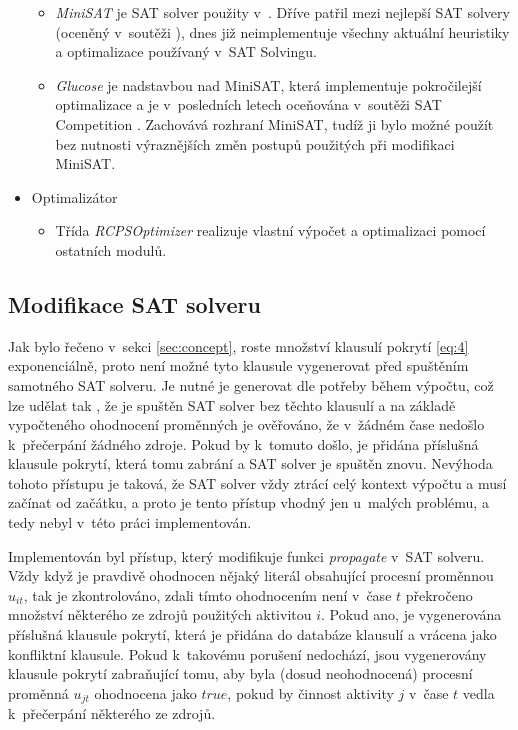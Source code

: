 \documentclass[a4paper, 12pt]{article}
\begin{document}
\begin{itemize}
    \begin{itemize}
        \item \emph{MiniSAT} \cite{www:minisat} je SAT solver použity v~\cite{horbach:10}.
        Dříve patřil mezi nejlepší SAT solvery (oceněný v~soutěži \cite{www:sat}), dnes již neimplementuje
        všechny aktuální heuristiky a optimalizace používaný v~SAT Solvingu.
        \item \emph{Glucose} \cite{www:glucose} je nadstavbou nad MiniSAT, která implementuje
        pokročilejší optimalizace a je v~posledních letech oceňována v~soutěži SAT Competition \cite{www:sat}.
        Zachovává rozhraní MiniSAT, tudíž ji bylo možné použít bez nutnosti výraznějších změn postupů použitých při
        modifikaci MiniSAT.
    \end{itemize}
 \item Optimalizátor
    \begin{itemize}
        \item Třída \emph{RCPSOptimizer} realizuje vlastní výpočet a optimalizaci pomocí ostatních modulů.
    \end{itemize}
\end{itemize}

\subsection{Modifikace SAT solveru}
Jak bylo řečeno v~sekci \ref{sec:concept}, roste množství klausulí pokrytí \ref{eq:4} exponenciálně,
proto není možné tyto klausule vygenerovat před spuštěním samotného SAT solveru.
Je nutné je generovat dle potřeby během výpočtu, což lze udělat tak \cite{horbach:10}, že je spuštěn SAT solver bez
těchto klausulí a na základě vypočteného ohodnocení proměnných je ověřováno, že v~žádném čase
nedošlo k~přečerpání žádného zdroje.
Pokud by k~tomuto došlo, je přidána příslušná klausule pokrytí, která tomu zabrání a SAT solver je spuštěn
znovu.
Nevýhoda tohoto přístupu je taková, že SAT solver vždy ztrácí celý kontext výpočtu a musí začínat od začátku, a proto
je tento přístup vhodný jen u~malých problému, a tedy nebyl v~této práci implementován.

Implementován byl přístup, který modifikuje funkci \emph{propagate} v~SAT solveru.
Vždy když je pravdivě ohodnocen nějaký literál obsahující procesní proměnnou $u_{it}$, tak je zkontrolováno,
zdali tímto ohodnocením není v~čase $t$ překročeno množství některého ze zdrojů použitých aktivitou $i$.
Pokud ano, je vygenerována příslušná klausule pokrytí, která je přidána do databáze klausulí a vrácena jako konfliktní klausule.
Pokud k~takovému porušení nedochází, jsou vygenerovány klausule pokrytí zabraňující tomu, aby byla 
(dosud neohodnocená) procesní proměnná $u_{jt}$ ohodnocena jako $true$,
pokud by činnost aktivity $j$ v~čase $t$ vedla k~přečerpání některého ze zdrojů.
\end{document}
